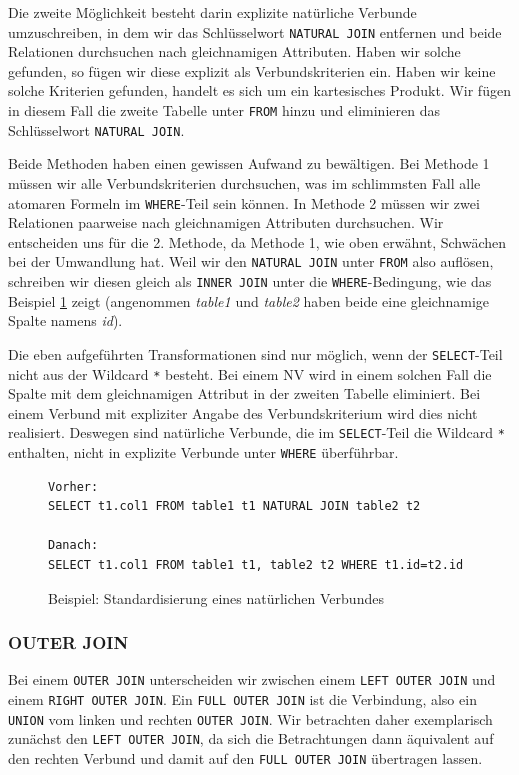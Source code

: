 Die zweite Möglichkeit besteht darin explizite natürliche Verbunde umzuschreiben, in dem wir das Schlüsselwort \verb|NATURAL JOIN| entfernen und beide Relationen durchsuchen nach gleichnamigen Attributen. Haben wir solche gefunden, so fügen wir diese explizit als Verbundskriterien ein. Haben wir keine solche Kriterien gefunden, handelt es sich um ein kartesisches Produkt. Wir fügen in diesem Fall die zweite Tabelle unter \verb|FROM| hinzu und eliminieren das Schlüsselwort \verb|NATURAL JOIN|.

Beide Methoden haben einen gewissen Aufwand zu bewältigen. Bei Methode 1 müssen wir alle Verbundskriterien durchsuchen, was im schlimmsten Fall alle atomaren Formeln im \verb|WHERE|-Teil sein können. In Methode 2 müssen wir zwei Relationen paarweise nach gleichnamigen Attributen durchsuchen.
Wir entscheiden uns für die 2. Methode, da Methode 1, wie oben erwähnt, Schwächen bei der Umwandlung hat. Weil wir den \verb|NATURAL JOIN| unter \verb|FROM| also auflösen, schreiben wir diesen gleich als \verb|INNER JOIN| unter die \verb|WHERE|-Bedingung, wie das  Beispiel \ref{bsp:natjoin} zeigt (angenommen \textit{table1} und \textit{table2} haben beide eine gleichnamige Spalte namens \textit{id}).

Die eben aufgeführten Transformationen sind nur möglich, wenn der \verb|SELECT|-Teil nicht aus der Wildcard \verb|*| besteht. Bei einem NV wird in einem solchen Fall die Spalte mit dem gleichnamigen Attribut in der zweiten Tabelle eliminiert. Bei einem Verbund mit expliziter Angabe des Verbundskriterium wird dies nicht realisiert. Deswegen sind natürliche Verbunde, die im \verb|SELECT|-Teil die Wildcard \verb|*| enthalten, nicht in explizite Verbunde unter \verb|WHERE| überführbar.

\begin{figure}
\begin{verbatim}
Vorher:
SELECT t1.col1 FROM table1 t1 NATURAL JOIN table2 t2

Danach:
SELECT t1.col1 FROM table1 t1, table2 t2 WHERE t1.id=t2.id
\end{verbatim}
\caption{Beispiel: Standardisierung eines natürlichen Verbundes}
\label{bsp:natjoin}
\end{figure}

\subsubsection*{OUTER JOIN}

Bei einem \verb|OUTER JOIN| unterscheiden wir zwischen einem \verb|LEFT OUTER JOIN| und einem \verb|RIGHT OUTER JOIN|. Ein \verb|FULL OUTER JOIN| ist die Verbindung, also ein \verb|UNION| vom linken und rechten \verb|OUTER JOIN|. Wir betrachten daher exemplarisch zunächst den \verb|LEFT OUTER JOIN|, da sich die Betrachtungen dann äquivalent auf den rechten Verbund und damit auf den \verb|FULL OUTER JOIN| übertragen lassen.


